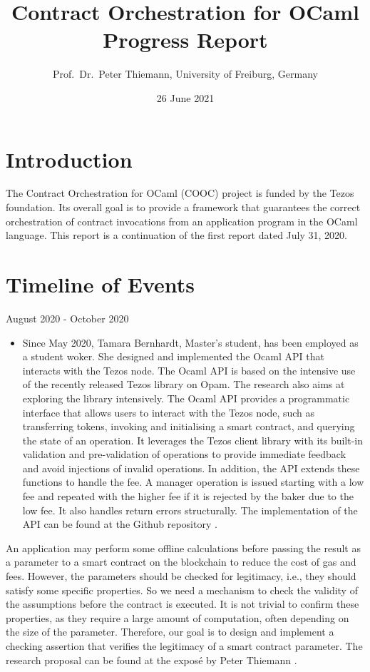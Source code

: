 \documentclass[a4paper,11pt]{article}
\title{Contract Orchestration for OCaml \\
  Progress Report 
}
\date{26 June 2021}
\author{Prof.\ Dr.\ Peter Thiemann, University of Freiburg, Germany}
\begin{document}
\maketitle{}

\section{Introduction}
\label{sec:introduction}

The Contract Orchestration for OCaml (COOC) project is funded by the Tezos foundation. Its overall goal  is to provide a framework that guarantees the correct orchestration of contract invocations from an application program in the OCaml language. This report is a continuation of the first report dated July 31, 2020.

\section{Timeline of Events}
\label{sec:timeline-events}

August 2020 - October 2020
\begin{itemize}
\item Since May 2020, Tamara Bernhardt, Master's student, has been employed as a student woker. She designed and implemented the Ocaml API that interacts with the Tezos node. The Ocaml API is based on the intensive use of the recently released Tezos library on Opam. The research  also aims at exploring the library intensively. The Ocaml API provides a programmatic interface that allows users to interact with the Tezos node, such as transferring tokens, invoking and initialising a smart contract, and querying the state of an operation. It leverages the Tezos client library with its built-in validation and pre-validation of operations to provide immediate feedback and avoid injections of invalid operations. In addition, the API extends these functions to handle the fee. A manager operation is issued starting with a low fee and repeated with the higher fee if it is rejected by the baker due to the low fee. It also handles return errors structurally. The implementation of the API can be found at the Github repository \cite{tezos-api}.
\end{itemize}

An application may perform some offline calculations before passing the result as a parameter to a smart contract on the blockchain to reduce the cost of gas and fees. However, the parameters should be checked for legitimacy, i.e., they should satisfy some specific properties. So we need a mechanism to check the validity of the assumptions before the contract is executed. It is not trivial to confirm these properties, as they  require a large amount of computation, often depending on the size of the parameter. Therefore, our goal is to design and implement a checking assertion that verifies the legitimacy of a smart contract parameter. The research proposal can be found at the expos\'{e} by Peter Thiemann \cite{expose}.
\end{document}

